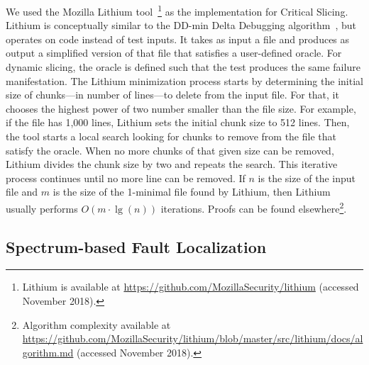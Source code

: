 \documentclass{article}
\begin{document}
We used the Mozilla Lithium tool~\footnote{Lithium is available at \url{https://github.com/MozillaSecurity/lithium} (accessed November 2018).} as the implementation
for Critical Slicing. Lithium is conceptually similar to the DD-min
Delta Debugging algorithm~\cite{zeller-hildebrandt-tse2002}, but
operates on code instead of test inputs. It takes as input a file and
produces as output a simplified version of that file that satisfies a
user-defined oracle. For dynamic slicing, the oracle is defined such
that the test produces the same failure manifestation. The Lithium
minimization process starts by determining the initial size of
chunks---in number of lines---to delete from the input file. For that,
it chooses the highest power of two number smaller than the file
size. For example, if the file has 1,000 lines, Lithium sets the
initial chunk size to 512 lines. Then, the tool starts a local search
looking for chunks to remove from the file that satisfy the
oracle. When no more chunks of that given size can be removed, Lithium
divides the chunk size by two and repeats the search. This iterative
process continues until no more line can be removed.  If $n$ is the
size of the input file and $m$ is the size of the 1-minimal file found
by Lithium, then Lithium usually performs $O(m\cdot\lg(n))$
iterations. Proofs can be found elsewhere\footnote{Algorithm complexity available at \url{https://github.com/MozillaSecurity/lithium/blob/master/src/lithium/docs/algorithm.md} (accessed November 2018).}.

\subsection{Spectrum-based Fault Localization}
\label{sec:sfl}
\end{document}
